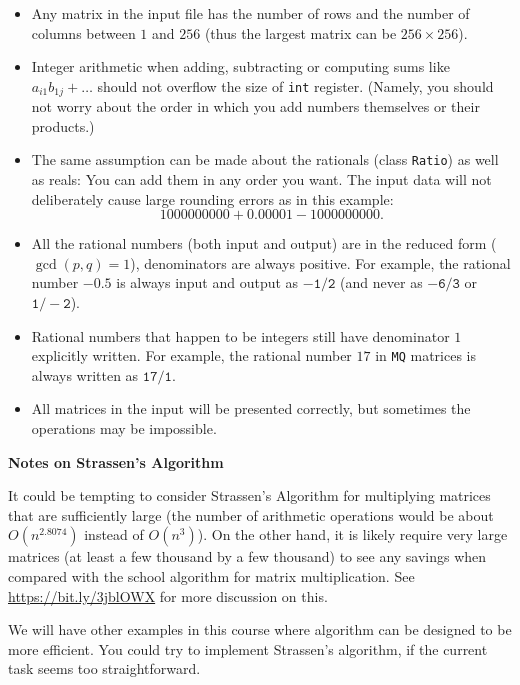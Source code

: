 \documentclass[11pt]{article}
\begin{document}
\begin{itemize}
\item Any matrix in the input file has the number of rows and the 
number of columns between $1$ and $256$ (thus the largest matrix can be
$256 \times 256$).
\item Integer arithmetic when adding, subtracting or computing sums like 
$a_{i1}b_{1j} + \ldots$ should not overflow the size of {\tt int} register. 
(Namely, you should not worry about the order in which you add numbers themselves
or their products.)
\item The same assumption can be made about the rationals (class {\tt Ratio}) as
well as reals: You can add them in any order you want. The input data will not 
deliberately cause large rounding errors as in this example:
$$1000000000 + 0.00001 - 1000000000.$$
\item All the rational numbers (both input and output) are in the reduced form ($\operatorname{gcd}(p,q)=1$), 
denominators are always positive. For example, the rational number $-0.5$ is always input and output
as $\mathtt{-1/2}$ (and never as $\mathtt{-6/3}$ or $\mathtt{1/-2}$). 
\item Rational numbers that happen to be integers still have denominator $1$ explicitly written. 
For example, the rational number $17$ in {\tt MQ} matrices is always written as $\mathtt{17/1}$.
\item All matrices in the input will be presented correctly, but sometimes the operations may be
impossible.
\end{itemize}


\vspace{10pt}
{\bf Notes on Strassen's Algorithm}

It could be tempting to consider Strassen's Algorithm for multiplying matrices that 
are sufficiently large (the number of arithmetic 
operations would be about $O(n^{2.8074})$ instead of  $O(n^3)$). 
On the other hand, it is likely require
very large matrices (at least a few thousand by a few
thousand) to see any savings when compared with the school algorithm for 
matrix multiplication. See \url{https://bit.ly/3jblOWX} for more discussion on this.

We will have other examples in this course where algorithm can be designed 
to be more efficient. You could try to implement Strassen's algorithm, 
if the current task seems too straightforward.
\end{document}
